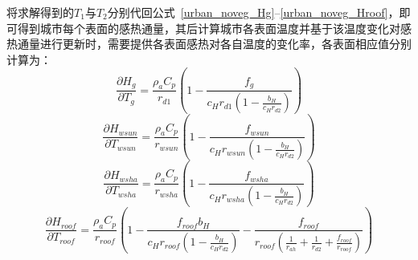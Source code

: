 将求解得到的$T_{1}$与$T_{2}$分别代回公式~\ref{urban_noveg_Hg}--\ref{urban_noveg_Hroof}，即可得到城市每个表面的感热通量，其后计算城市各表面温度并基于该温度变化对感热通量进行更新时，需要提供各表面感热对各自温度的变化率，各表面相应值分别计算为：
\begin{equation}
\frac{\partial H_{g}}{\partial T_{g}} = \frac{\rho _a C_p}{r_{d1}} \left(1-\frac{f_g}{c_{H} r_{d1} \left(1-\frac{b_H}{c_{H} r_{d2}}\right)}\right)
\end{equation}
%
\begin{equation}
\frac{\partial H_{wsun}}{\partial T_{wsun}} = \frac{\rho _a C_p}{r_{wsun}} \left(1-\frac{f_{wsun}}{c_{H} r_{wsun} \left(1-\frac{b_H}{c_{H} r_{d2}}\right)}\right)
\end{equation}
%
\begin{equation}
\frac{\partial H_{wsha}}{\partial T_{wsha}} = \frac{\rho _a C_p}{r_{wsha}} \left(1-\frac{f_{wsha}}{c_{H} r_{wsha} \left(1-\frac{b_H}{c_{H} r_{d2}}\right)}\right)
\end{equation}
%
\begin{equation}
\frac{\partial H_{roof}}{\partial T_{roof}} = \frac{\rho _a C_p}{r_{roof}} \left(1-\frac{f_{roof} b_{H}}{c_{H} r_{roof} \left(1-\frac{b_H}{c_{H} r_{d2}}\right)}-\frac{f_{roof}}{r_{roof}\left(\frac{1}{r_{ah}}+\frac{1}{r_{d2}}+\frac{f_{roof}}{r_{roof}}\right)}\right)
\end{equation}

